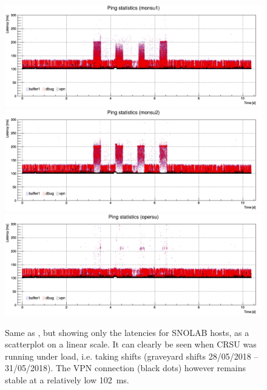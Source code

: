 \documentclass[a4paper,10pt]{article}
\begin{document}
\begin{figure}[htp]
	\centering
	\includegraphics[width=\textwidth]{images/monsu1_latency_zoom}\\
	\includegraphics[width=\textwidth]{images/monsu2_latency_zoom}\\
	\includegraphics[width=\textwidth]{images/opersu_latency_zoom}
	\caption{Same as , but showing only the latencies for SNOLAB hosts, as a scatterplot on a linear scale. It can clearly be seen when CRSU was running under load, i.e. taking shifts (graveyard shifts 28/05/2018 -- 31/05/2018). The VPN connection (black dots) however remains stable at a relatively low 102~ms.}
	\label{latency_final_2}
\end{figure}
\end{document}
